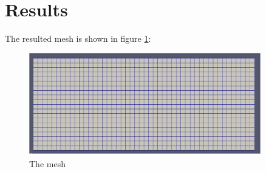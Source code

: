 %
%
%
%
%
%
%
%
\section{Results}
The resulted mesh is shown in figure \ref{fig:supertab:mesh}:
\begin{figure}[H]%
\begin{center}
%
  \includegraphics[width=0.9\textwidth]{mesh}
%
\end{center}
\caption
{The mesh}
\label{fig:supertab:mesh}
\end{figure}
%
